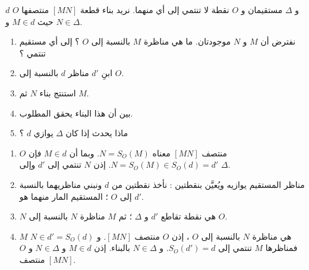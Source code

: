 \documentclass[12pt,a4paper]{article}
\begin{document}
\begin{corr}[title={نقطتان متناظرتان على مستقيمين}, stars=4, source={Axiomaths}]
$d$ و $\Delta$ مستقيمان و $O$ نقطة لا تنتمي إلى أي منهما. نريد بناء قطعة $[MN]$ منتصفها $O$ حيث $M\in d$ و $N\in\Delta$.
\begin{center}
\end{center}
\begin{enumerate}
  \item نفترض أن $M$ و $N$ موجودتان. ما هي مناظرة $M$ بالنسبة إلى $O$ ؟ إلى أي مستقيم تنتمي ؟
  \item ابنِ $d'$ مناظر $d$ بالنسبة إلى $O$.
  \item استنتج بناء $N$ ثم $M$.
  \item بين أن هذا البناء يحقق المطلوب.
  \item ماذا يحدث إذا كان $\Delta$ يوازي $d$ ؟
\end{enumerate}
\axsol
\begin{enumerate}[itemsep=14pt]
  \item $O$ منتصف $[MN]$ معناه $N=S_O(M)$. وبما أن $M\in d$ فإن $N=S_O(M)\in S_O(d)=d'$. إذن $N$ تنتمي إلى $d'$ وإلى $\Delta$.
  \item مناظر المستقيم يوازيه ويُعيَّن بنقطتين : نأخذ نقطتين من $d$ ونبني مناظريهما بالنسبة إلى $O$ ؛ المستقيم المار منهما هو $d'$.
  \item $N$ هي نقطة تقاطع $d'$ و $\Delta$ ؛ ثم $M$ مناظرة $N$ بالنسبة إلى $O$.
  \begin{center}
  \end{center}
  \item $M$ هي مناظرة $N$ بالنسبة إلى $O$ ، إذن $O$ منتصف $[MN]$. و $N\in d'=S_O(d)$ فمناظرها $M$ تنتمي إلى $S_O(d')=d$. و $N\in\Delta$ بالبناء. إذن $M\in d$ و $N\in\Delta$ و $O$ منتصف $[MN]$.

\end{enumerate}
\end{corr}
\end{document}
